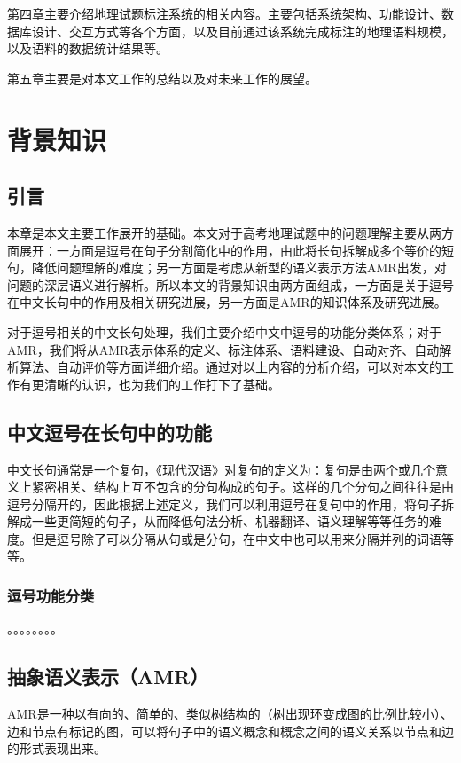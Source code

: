 \documentclass[master, winfont]{njuthesis}
\begin{document}
第四章主要介绍地理试题标注系统的相关内容。主要包括系统架构、功能设计、数据库设计、交互方式等各个方面，以及目前通过该系统完成标注的地理语料规模，以及语料的数据统计结果等。

第五章主要是对本文工作的总结以及对未来工作的展望。

\chapter{背景知识}
\section{引言}
本章是本文主要工作展开的基础。本文对于高考地理试题中的问题理解主要从两方面展开：一方面是逗号在句子分割简化中的作用，由此将长句拆解成多个等价的短句，降低问题理解的难度；另一方面是考虑从新型的语义表示方法AMR出发，对问题的深层语义进行解析。所以本文的背景知识由两方面组成，一方面是关于逗号在中文长句中的作用及相关研究进展，另一方面是AMR的知识体系及研究进展。

对于逗号相关的中文长句处理，我们主要介绍中文中逗号的功能分类体系；对于AMR，我们将从AMR表示体系的定义、标注体系、语料建设、自动对齐、自动解析算法、自动评价等方面详细介绍。通过对以上内容的分析介绍，可以对本文的工作有更清晰的认识，也为我们的工作打下了基础。


\section{中文逗号在长句中的功能}\label{section:modeling}
中文长句通常是一个复句，《现代汉语》对复句的定义为：复句是由两个或几个意义上紧密相关、结构上互不包含的分句构成的句子\cite{zhou2008}。这样的几个分句之间往往是由逗号分隔开的，因此根据上述定义，我们可以利用逗号在复句中的作用，将句子拆解成一些更简短的句子，从而降低句法分析、机器翻译、语义理解等等任务的难度。但是逗号除了可以分隔从句或是分句，在中文中也可以用来分隔并列的词语等等。

\subsection{逗号功能分类}
。。。。。。。。

\section{抽象语义表示（AMR）}
AMR是一种以有向的、简单的、类似树结构的（树出现环变成图的比例比较小）、边和节点有标记的图\cite{Banarescu2013Abstract}，可以将句子中的语义概念和概念之间的语义关系以节点和边的形式表现出来。
\end{document}
